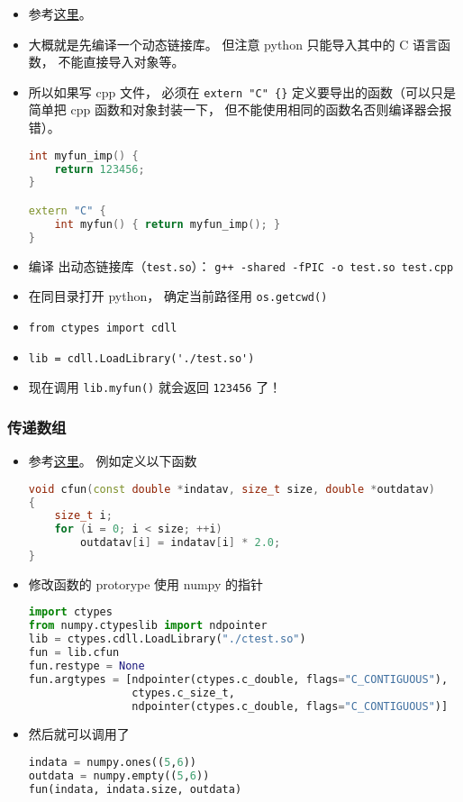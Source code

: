 
\begin{issues}
\issueDraft
\end{issues}

\begin{itemize}
\item 参考\href{https://www.geeksforgeeks.org/how-to-call-c-c-from-python/}{这里}。
\item 大概就是先编译一个动态链接库。 但注意 python 只能导入其中的 C 语言函数， 不能直接导入对象等。
\item 所以如果写 cpp 文件， 必须在 \verb|extern "C" {}| 定义要导出的函数（可以只是简单把 cpp 函数和对象封装一下， 但不能使用相同的函数名否则编译器会报错）。
\begin{lstlisting}[language=cpp, caption=test.cpp]
int myfun_imp() {
	return 123456;
}

extern "C" {
	int myfun() { return myfun_imp(); }
}
\end{lstlisting}
\item 编译 出动态链接库（\verb|test.so|）： \verb|g++ -shared -fPIC -o test.so test.cpp|
\item 在同目录打开 python， 确定当前路径用 \verb|os.getcwd()|
\item \verb|from ctypes import cdll|
\item \verb|lib = cdll.LoadLibrary('./test.so')|
\item 现在调用 \verb|lib.myfun()| 就会返回 \verb|123456| 了！
\end{itemize}

\subsubsection{传递数组}
\begin{itemize}
\item 参考\href{https://stackoverflow.com/questions/5862915/passing-numpy-arrays-to-a-c-function-for-input-and-output}{这里}。 例如定义以下函数
\begin{lstlisting}[language=cpp]
void cfun(const double *indatav, size_t size, double *outdatav) 
{
    size_t i;
    for (i = 0; i < size; ++i)
        outdatav[i] = indatav[i] * 2.0;
}
\end{lstlisting}
\item 修改函数的 protorype 使用 numpy 的指针
\begin{lstlisting}[language=python]
import ctypes
from numpy.ctypeslib import ndpointer
lib = ctypes.cdll.LoadLibrary("./ctest.so")
fun = lib.cfun
fun.restype = None
fun.argtypes = [ndpointer(ctypes.c_double, flags="C_CONTIGUOUS"),
                ctypes.c_size_t,
                ndpointer(ctypes.c_double, flags="C_CONTIGUOUS")]
\end{lstlisting}
\item 然后就可以调用了
\begin{lstlisting}[language=python]
indata = numpy.ones((5,6))
outdata = numpy.empty((5,6))
fun(indata, indata.size, outdata)
\end{lstlisting}
\end{itemize}
